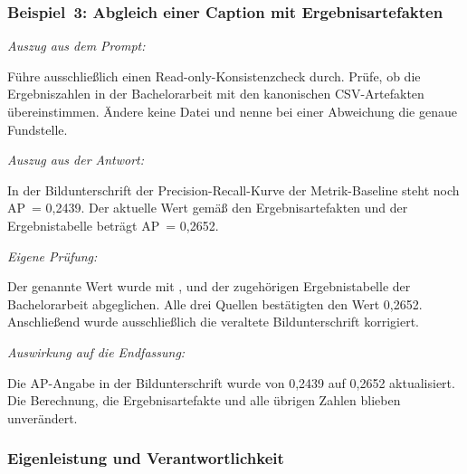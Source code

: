 \subsubsection*{Beispiel~3: Abgleich einer Caption mit Ergebnisartefakten}

\noindent\textit{Auszug aus dem Prompt:}\par
\begin{kiblock}
Führe ausschließlich einen Read-only-Konsistenzcheck durch.
Prüfe, ob die Ergebniszahlen in der Bachelorarbeit mit den kanonischen
CSV-Artefakten übereinstimmen. Ändere keine Datei und nenne bei einer Abweichung
die genaue Fundstelle.
\end{kiblock}

\noindent\textit{Auszug aus der Antwort:}\par
\begin{kiblock}
In der Bildunterschrift der Precision-Recall-Kurve der
Metrik-Baseline steht noch AP~= 0{,}2439. Der aktuelle Wert gemäß den
Ergebnisartefakten und der Ergebnistabelle beträgt AP~= 0{,}2652.
\end{kiblock}

\noindent\textit{Eigene Prüfung:}\par
\begin{kiblock}
Der genannte Wert wurde mit ,
 und der zugehörigen Ergebnistabelle der
Bachelorarbeit abgeglichen. Alle drei Quellen bestätigten den Wert 0{,}2652.
Anschließend wurde ausschließlich die veraltete Bildunterschrift korrigiert.
\end{kiblock}

\noindent\textit{Auswirkung auf die Endfassung:}\par
\begin{kiblock}
Die AP-Angabe in der Bildunterschrift wurde von 0{,}2439 auf 0{,}2652
aktualisiert. Die Berechnung, die Ergebnisartefakte und alle übrigen Zahlen
blieben unverändert.
\end{kiblock}

\subsubsection*{Eigenleistung und Verantwortlichkeit}

